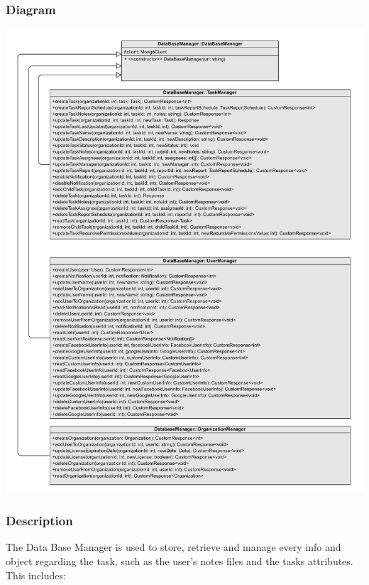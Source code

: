\documentclass{article}
\begin{document}
\subsubsection{Diagram}


\includegraphics[width=\textwidth,height=\textheight,keepaspectratio]{images/class_diagram/database_manager.jpg}

\subsubsection{Description}

The Data Base Manager is used to store, retrieve and manage every info and object regarding the task, such as the user's notes files and the tasks attributes.
This includes:
\end{document}
